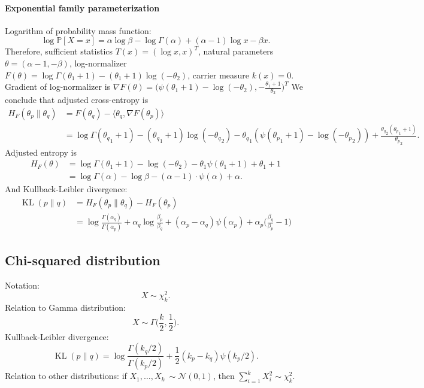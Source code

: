 \documentclass[a4paper,11pt]{article}
\theoremstyle{plain}
\theoremstyle{definition}
\newcommand{\MP}{\mathbb{P}}
\begin{document}
	\paragraph{Exponential family parameterization}
	Logarithm of probability mass function:
	\[
	\log \MP[X = x] = \alpha \log \beta - \log \Gamma(\alpha) + (\alpha - 1) \log x - \beta x.
	\]
	Therefore, sufficient statistics $T(x) = (\log x, x)^T$, natural parameters $\theta = (\alpha-1, -\beta)$, log-normalizer $F(\theta) = \log \Gamma (\theta_1 + 1) - (\theta_1 + 1) \log (-\theta_2)$, carrier measure $k(x) = 0$. Gradient of log-normalizer is $\nabla F(\theta) = \big(\psi(\theta_1 + 1) - \log(-\theta_2), -\frac{\theta_1+1}{\theta_2} \big)^T$ We conclude that adjusted cross-entropy is
	\[
	\begin{aligned}
	H_F(\theta_p \| \theta_q) &= F(\theta_q) - \langle \theta_q, \nabla F(\theta_p) \rangle \\
	&= \log \Gamma ({\theta_q}_1 + 1) - ({\theta_q}_1 + 1) \log (-{\theta_q}_2) - {\theta_q}_1 (\psi({\theta_p}_1 + 1) - \log(-{\theta_p}_2)) + \frac{{\theta_q}_2 ({\theta_p}_1 + 1)}{{\theta_p}_2}.
	\end{aligned}
	\]
	Adjusted entropy is
	\[
	\begin{aligned}
	H_F(\theta) &= \log \Gamma ({\theta}_1 + 1) - \log (-{\theta}_2) - {\theta}_1 \psi({\theta}_1 + 1) + {\theta}_1 + 1 \\
	& = \log \Gamma (\alpha) - \log \beta - (\alpha - 1) \cdot \psi (\alpha) + \alpha.
	\end{aligned}
	\]
	And Kullback-Leibler divergence:
	\[
	\begin{aligned}
	\operatorname{KL}(p \| q) &= H_F(\theta_p \| \theta_q) - H_F(\theta_p) \\
	&= \log \frac{\Gamma (\alpha_q)}{\Gamma (\alpha_p)} + \alpha_q \log \frac{\beta_p}{\beta_q} + (\alpha_p - \alpha_q) \psi(\alpha_p) + \alpha_p \bigg(\frac{\beta_q}{\beta_p} - 1\bigg)
	\end{aligned}
	\]
	
	\subsection{Chi-squared distribution}
	Notation:
	\[
	X \sim \chi_k^2.
	\]
	Relation to Gamma distribution:
	\[
	X \sim \Gamma\bigg( \frac{k}{2}, \frac{1}{2} \bigg).
	\]
	Kullback-Leibler divergence:
	\[
	\operatorname{KL}(p \| q) = \log \frac{\Gamma(k_q/2)}{\Gamma(k_p/2)} + \frac{1}{2}(k_p - k_q) \psi(k_p / 2).
	\]
	Relation to other distributions: if $X_1, \dots, X_k ~ \sim \mathcal{N}(0, 1)$, then $\sum_{i=1}^{k}X_i^2 \sim \chi_k^2$.
	
\end{document}
